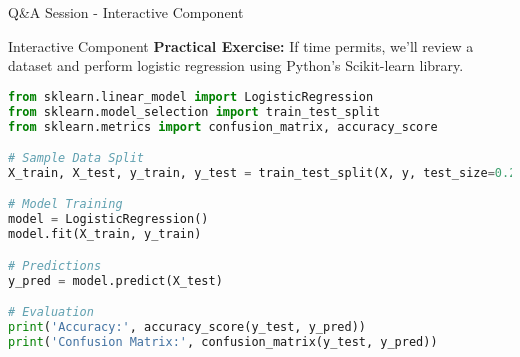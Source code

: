 \documentclass[aspectratio=169]{beamer}
\begin{document}
\begin{frame}[fragile]{Q\&A Session - Interactive Component}
  \begin{block}{Interactive Component}
    \textbf{Practical Exercise:} If time permits, we'll review a dataset and perform logistic regression using Python's Scikit-learn library.
  \end{block}

  \begin{lstlisting}[language=Python]
from sklearn.linear_model import LogisticRegression
from sklearn.model_selection import train_test_split
from sklearn.metrics import confusion_matrix, accuracy_score

# Sample Data Split
X_train, X_test, y_train, y_test = train_test_split(X, y, test_size=0.2)

# Model Training
model = LogisticRegression()
model.fit(X_train, y_train)

# Predictions
y_pred = model.predict(X_test)

# Evaluation
print('Accuracy:', accuracy_score(y_test, y_pred))
print('Confusion Matrix:', confusion_matrix(y_test, y_pred))
  \end{lstlisting}
\end{frame}
\end{document}

